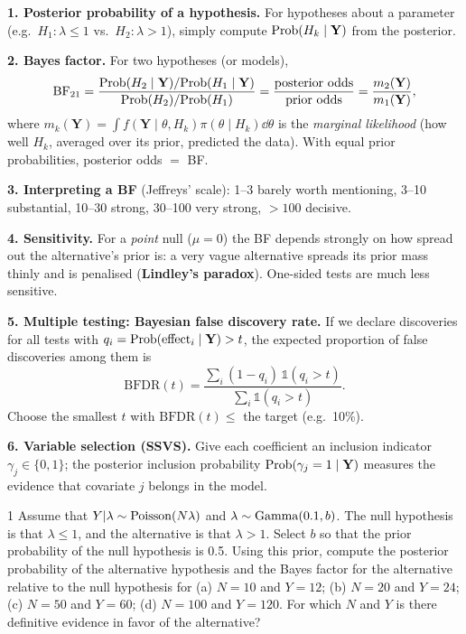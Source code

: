 \documentclass[11pt]{article}
\begin{document}
\begin{recall}
\textbf{1. Posterior probability of a hypothesis.} For hypotheses about a parameter (e.g.\ $H_1:\lambda\le1$ vs.\ $H_2:\lambda>1$), simply compute $\mathrm{Prob}(H_k\mid\mathbf Y)$ from the posterior.

\medskip
\textbf{2. Bayes factor.} For two hypotheses (or models),
\[
\text{BF}_{21}=\frac{\mathrm{Prob}(H_2\mid\mathbf Y)/\mathrm{Prob}(H_1\mid\mathbf Y)}{\mathrm{Prob}(H_2)/\mathrm{Prob}(H_1)}=\frac{\text{posterior odds}}{\text{prior odds}}=\frac{m_2(\mathbf Y)}{m_1(\mathbf Y)},
\]
where $m_k(\mathbf Y)=\int f(\mathbf Y\mid\theta,H_k)\pi(\theta\mid H_k)\dd\theta$ is the \emph{marginal likelihood} (how well $H_k$, averaged over its prior, predicted the data). With equal prior probabilities, posterior odds $=$ BF.

\medskip
\textbf{3. Interpreting a BF} (Jeffreys' scale): 1--3 barely worth mentioning, 3--10 substantial, 10--30 strong, 30--100 very strong, $>100$ decisive.

\medskip
\textbf{4. Sensitivity.} For a \emph{point} null ($\mu=0$) the BF depends strongly on how spread out the alternative's prior is: a very vague alternative spreads its prior mass thinly and is penalised (\textbf{Lindley's paradox}). One-sided tests are much less sensitive.

\medskip
\textbf{5. Multiple testing: Bayesian false discovery rate.} If we declare discoveries for all tests with $q_i=\mathrm{Prob}(\text{effect}_i\mid\mathbf Y)>t$, the expected proportion of false discoveries among them is
\[
\text{BFDR}(t)=\frac{\sum_i(1-q_i)\,\mathbb 1(q_i>t)}{\sum_i\mathbb 1(q_i>t)}.
\]
Choose the smallest $t$ with $\text{BFDR}(t)\le$ the target (e.g.\ 10\%).

\medskip
\textbf{6. Variable selection (SSVS).} Give each coefficient an inclusion indicator $\gamma_j\in\{0,1\}$; the posterior inclusion probability $\mathrm{Prob}(\gamma_j=1\mid\mathbf Y)$ measures the evidence that covariate $j$ belongs in the model.
\end{recall}

\clearpage


\begin{problem}{1}
Assume that $Y|\lambda\sim\mathrm{Poisson}(N\lambda)$ and $\lambda\sim\mathrm{Gamma}(0.1,b)$. The null hypothesis is that $\lambda\le1$, and the alternative is that $\lambda>1$. Select $b$ so that the prior probability of the null hypothesis is 0.5. Using this prior, compute the posterior probability of the alternative hypothesis and the Bayes factor for the alternative relative to the null hypothesis for (a) $N=10$ and $Y=12$; (b) $N=20$ and $Y=24$; (c) $N=50$ and $Y=60$; (d) $N=100$ and $Y=120$. For which $N$ and $Y$ is there definitive evidence in favor of the alternative?
\end{problem}
\end{document}
